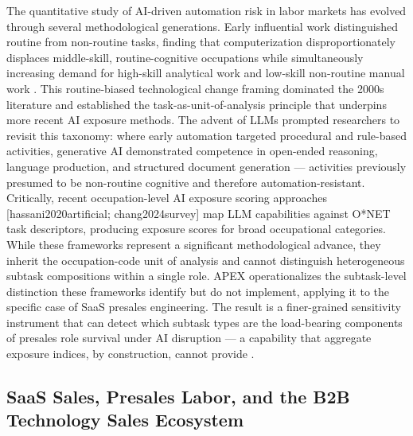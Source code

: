 \documentclass[10pt, conference]{IEEEtran}
\begin{document}
The quantitative study of AI-driven automation risk in labor markets has evolved through several methodological generations. Early influential work distinguished routine from non-routine tasks, finding that computerization disproportionately displaces middle-skill, routine-cognitive occupations while simultaneously increasing demand for high-skill analytical work and low-skill non-routine manual work \cite{santana2020future}. This routine-biased technological change framing dominated the 2000s literature and established the task-as-unit-of-analysis principle that underpins more recent AI exposure methods. The advent of LLMs prompted researchers to revisit this taxonomy: where early automation targeted procedural and rule-based activities, generative AI demonstrated competence in open-ended reasoning, language production, and structured document generation --- activities previously presumed to be non-routine cognitive and therefore automation-resistant. Critically, recent occupation-level AI exposure scoring approaches [hassani2020artificial; chang2024survey] map LLM capabilities against O*NET task descriptors, producing exposure scores for broad occupational categories. While these frameworks represent a significant methodological advance, they inherit the occupation-code unit of analysis and cannot distinguish heterogeneous subtask compositions within a single role. APEX operationalizes the subtask-level distinction these frameworks identify but do not implement, applying it to the specific case of SaaS presales engineering. The result is a finer-grained sensitivity instrument that can detect which subtask types are the load-bearing components of presales role survival under AI disruption --- a capability that aggregate exposure indices, by construction, cannot provide \cite{martinezplumed2020futures}.

\subsection{SaaS Sales, Presales Labor, and the B2B Technology Sales Ecosystem}

\label{sec:saas_sales_presales_labor_and_the_b2b_te}
\end{document}
